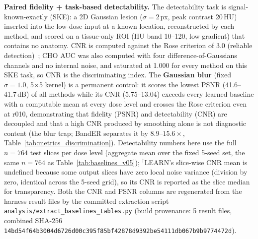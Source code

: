 \documentclass[twoside,11pt]{article}
\begin{document}
\begin{table}[ht]
    \caption{\textbf{Paired fidelity + task-based detectability.} The detectability task is signal-known-exactly (SKE): a 2D Gaussian lesion ($\sigma = 2$\,px, peak contrast 20\,HU) inserted into the low-dose input at a known location, reconstructed by each method, and scored on a tissue-only ROI (HU band 10--120, low gradient) that contains no anatomy. CNR is computed against the Rose criterion of 3.0 (reliable detection)~\citep{rose1948sensitivity,burgess1999rose}; CHO AUC was also computed with four difference-of-Gaussians channels and no internal noise, and saturated at 1.000 for every method on this SKE task, so CNR is the discriminating index. The \textbf{Gaussian blur} (fixed $\sigma = 1.0$, 5$\times$5 kernel) is a permanent control: it scores the lowest PSNR (41.6--41.7\,dB) of all methods while its CNR (5.75--13.04) exceeds every learned baseline with a computable mean at every dose level and crosses the Rose criterion even at r010, demonstrating that fidelity (PSNR) and detectability (CNR) are decoupled and that a high CNR produced by smoothing alone is not diagnostic content (the blur trap; BandER separates it by $8.9$--$15.6\times$, Table~\ref{tab:metrics_discrimination}). Detectability numbers here use the full $n = 764$ test slices per dose level (aggregate mean over the fixed 5-seed set, the same $n = 764$ as Table~\ref{tab:baselines_v05}); $^{\dagger}$LEARN's slice-wise CNR mean is undefined because some output slices have zero local noise variance (division by zero, identical across the 5-seed grid), so its CNR is reported as the slice median for transparency. Both the CNR and PSNR columns are regenerated from the harness result files by the committed extraction script \texttt{analysis/extract\_baselines\_tables.py} (build provenance: 5 result files, combined SHA-256 \texttt{14bd54f64b3004d6726d00c395f85bf42878d9392be54111db067b9b9774472d}).}
    \label{tab:detectability_v05}
\end{table}
\end{document}
